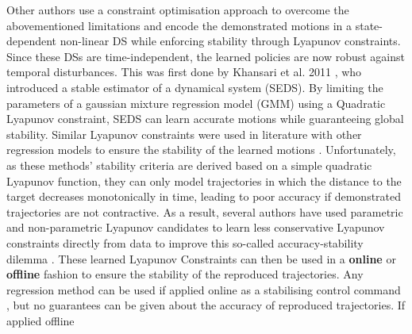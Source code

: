 
Other authors use a constraint optimisation approach to overcome the abovementioned limitations and encode the demonstrated motions in a state-dependent non-linear DS while enforcing stability through Lyapunov constraints. Since these DSs are time-independent, the learned policies are now robust against temporal disturbances. This was first done by Khansari et al. 2011 \cite{khansari-zadehLearningStableNonlinear2011}, who introduced a stable estimator of a dynamical system (SEDS). By limiting the parameters of a gaussian mixture regression model (GMM) using a Quadratic Lyapunov constraint, SEDS can learn accurate motions while guaranteeing global stability. Similar Lyapunov constraints were used in literature with other regression models to ensure the stability of the learned motions \cite{lemmeNeurallyImprintedStable2013,huNeuralLearningStable2015,umlauftLearningStableStochastic2017,umlauftLearningStableGaussian2017,medinaLearningStableTask2017,duanFastStableLearning2019,xuRobotTrajectoryTracking2019,umlauftLearningStochasticallyStable2020,xuLearningBasedKinematicControl2022,salehiLearningDiscreteTimeUncertain2022,davoodiRuleBasedSafeProbabilistic2022}. Unfortunately, as these methods' stability criteria are derived based on a simple quadratic Lyapunov function, they can only model trajectories in which the distance to the target decreases monotonically in time, leading to poor accuracy if demonstrated trajectories are not contractive. As a result, several authors have used parametric and non-parametric Lyapunov candidates to learn less conservative Lyapunov constraints directly from data to improve this so-called accuracy-stability dilemma \cite{khansari-zadehLearningControlLyapunov2014,neumannNeuralLearningStable2013,lemmeNeuralLearningVector2014,umlauftLearningStableGaussian2017,umlauftUncertaintybasedControlLyapunov2018,duttaLearningStableMovement2018,umlauftUncertaintybasedHumanMotion2019,duttaSkillLearningHuman2021,ravanbakhshLearningControlLyapunov2019,ravanbakhshFormalPolicyLearning2019,umlauftLearningStochasticallyStable2020,xiaoLearningStableNonparametric2020,tesfazgiInverseReinforcementLearning2021,coulombeGeneratingStableCollisionFree2022}. These learned Lyapunov Constraints can then be used in a \textbf{online} or \textbf{offline} fashion to ensure the stability of the reproduced trajectories. Any regression method can be used if applied online as a stabilising control command \cite{zadehLearningControlLyapunov2014,umlauftLearningStableGaussian2017,umlauftUncertaintybasedControlLyapunov2018,duttaLearningStableMovement2018,umlauftUncertaintybasedHumanMotion2019,ravanbakhshFormalPolicyLearning2019,ravanbakhshLearningControlLyapunov2019,xiaoLearningStableNonparametric2020,duttaSkillLearningHuman2021,umlauftLearningStochasticallyStable2020}, but no guarantees can be given about the accuracy of reproduced trajectories. If applied offline 